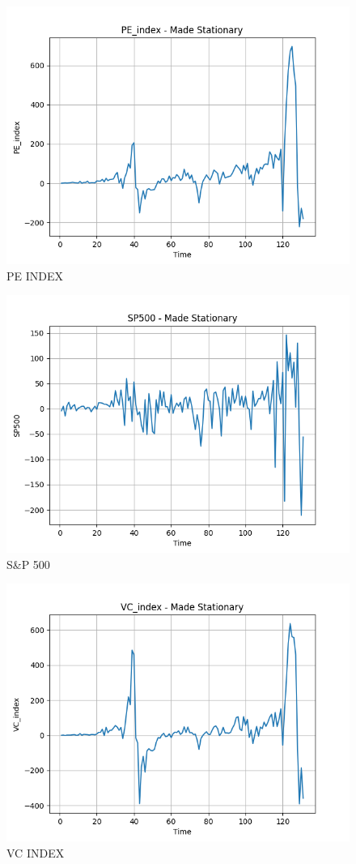\documentclass[12pt]{article}
\begin{document}
\begin{figure}[H]
    \centering
    \includegraphics[width=0.75\linewidth]{PE_index_stationary.png}
    \caption{PE INDEX}
    \label{fig:enter-label}
\end{figure}
\begin{figure}[H]
    \centering
    \includegraphics[width=0.75\linewidth]{SP500_stationary.png}
    \caption{S\&P 500}
    \label{fig:enter-label}
\end{figure}
\begin{figure}[H]
    \centering
    \includegraphics[width=0.75\linewidth]{VC_index_stationary.png}
    \caption{VC INDEX}
    \label{fig:enter-label}
\end{figure}
\end{document}
